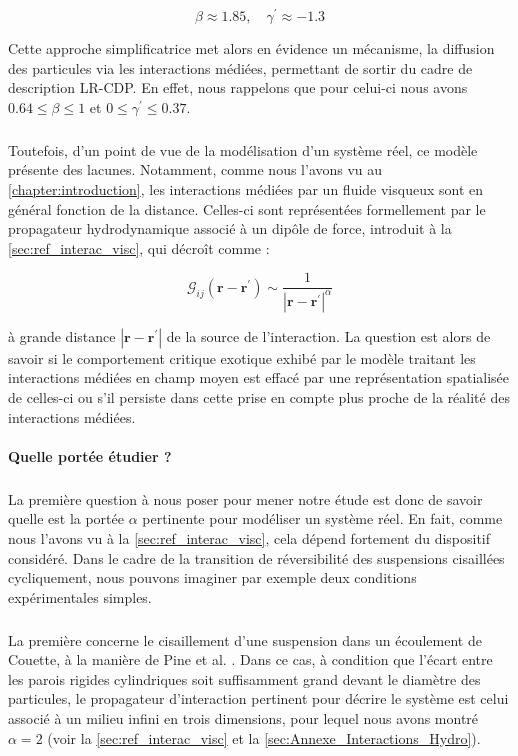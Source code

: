 \begin{equation}
	\beta \approx 1.85, \quad \gamma^\prime \approx -1.3 
\end{equation}

\noindent Cette approche simplificatrice met alors en évidence un mécanisme, la diffusion des particules via les interactions médiées, permettant de sortir du cadre de description LR-CDP. En effet, nous rappelons que pour celui-ci nous avons $0.64 \leq \beta \leq 1$ et $0 \leq\gamma^\prime \leq 0.37$. 

\subparagraph{}Toutefois, d'un point de vue de la modélisation d'un système réel, ce modèle présente des lacunes. Notamment, comme nous l'avons vu au \autoref{chapter:introduction}, les interactions médiées par un fluide visqueux sont en général fonction de la distance. Celles-ci sont représentées formellement par le propagateur hydrodynamique associé à un dipôle de force, introduit à la \autoref{sec:ref_interac_visc}, qui décroît comme :

\begin{equation}
	\mathcal{G}_{ij}(\mathbf{r} - \mathbf{r}^\prime) \sim \frac{1}{|\mathbf{r} - \mathbf{r}^\prime|^\alpha}
\end{equation}

\noindent à grande distance $|\mathbf{r} - \mathbf{r}^\prime|$ de la source de l'interaction. La question est alors de savoir si le comportement critique exotique exhibé par le modèle traitant les interactions médiées en champ moyen est effacé par une représentation spatialisée de celles-ci ou s'il persiste dans cette prise en compte plus proche de la réalité des interactions médiées.

\paragraph{Quelle portée étudier ?}

\subparagraph{}La première question à nous poser pour mener notre étude est donc de savoir quelle est la portée $\alpha$ pertinente pour modéliser un système réel. En fait, comme nous l'avons vu à la \autoref{sec:ref_interac_visc}, cela dépend fortement du dispositif considéré. Dans le cadre de la transition de réversibilité des suspensions cisaillées cycliquement, nous pouvons imaginer par exemple deux conditions expérimentales simples.

\subparagraph{}La première concerne le cisaillement d'une suspension dans un écoulement de Couette, à la manière de Pine et al. \cite{pine_chaos_2005}. Dans ce cas, à condition que l'écart entre les parois rigides cylindriques soit suffisamment grand devant le diamètre des particules, le propagateur d'interaction pertinent pour décrire le système est celui associé à un milieu infini en trois dimensions, pour lequel nous avons montré $\alpha = 2$ (voir la \autoref{sec:ref_interac_visc} et la \autoref{sec:Annexe_Interactions_Hydro}).

